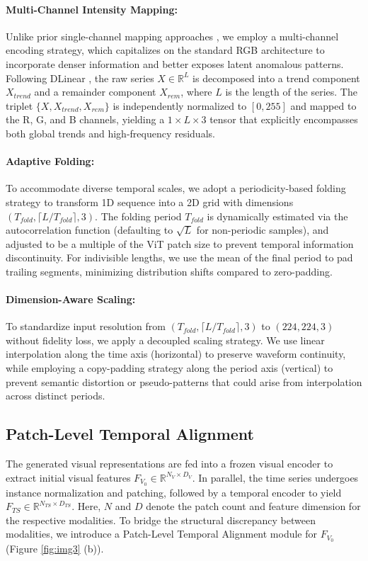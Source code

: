 \documentclass{article}
\theoremstyle{plain}
\theoremstyle{definition}
\theoremstyle{remark}
\begin{document}
\paragraph{Multi-Channel Intensity Mapping:}
Unlike prior single-channel mapping approaches \cite{chen2024visionts}, we employ a multi-channel encoding strategy, which capitalizes on the standard RGB architecture to incorporate denser information and better exposes latent anomalous patterns. Following DLinear \cite{Zeng2022AreTE}, the raw series $X \in \mathbb{R}^{L}$ is decomposed into a trend component $X_{trend}$ and a remainder component $X_{rem}$, where $L$ is the length of the series. The triplet $\{X, X_{trend}, X_{rem}\}$ is independently normalized to $[0, 255]$ and mapped to the R, G, and B channels, yielding a $1 \times L \times 3$ tensor that explicitly encompasses both global trends and high-frequency residuals.
\vspace{-0.5em}
\paragraph{Adaptive Folding:}
To accommodate diverse temporal scales, we adopt a periodicity-based folding strategy \cite{wu2023timesnet} to transform 1D sequence into a 2D grid with dimensions $(T_{fold}, \lceil L/T_{fold} \rceil, 3)$. The folding period $T_{fold}$ is dynamically estimated via the autocorrelation function (defaulting to $\sqrt{L}$ for non-periodic samples), and adjusted to be a multiple of the ViT patch size to prevent temporal information discontinuity. For indivisible lengths, we use the mean of the final period to pad trailing segments, minimizing distribution shifts compared to zero-padding.
\vspace{-0.5em}
\paragraph{Dimension-Aware Scaling:}
To standardize input resolution from $(T_{fold}, \lceil L/T_{fold} \rceil, 3)$ to $(224, 224, 3)$ without fidelity loss, we apply a decoupled scaling strategy. We use linear interpolation along the time axis (horizontal) to preserve waveform continuity, while employing a copy-padding strategy along the period axis (vertical) to prevent semantic distortion or pseudo-patterns that could arise from interpolation across distinct periods.

\vspace{-0.5em}
\subsection{Patch-Level Temporal Alignment}
The generated visual representations are fed into a frozen visual encoder to extract initial visual features $F_{V_0} \in \mathbb{R}^{N_V \times D_V}$. In parallel, the time series undergoes instance normalization and patching, followed by a temporal encoder to yield $F_{TS} \in \mathbb{R}^{N_{TS} \times D_{TS}}$. Here, $N$ and $D$ denote the patch count and feature dimension for the respective modalities. To bridge the structural discrepancy between modalities, we introduce a Patch-Level Temporal Alignment module for $F_{V_0}$ (Figure \ref{fig:img3} (b)).
\end{document}
